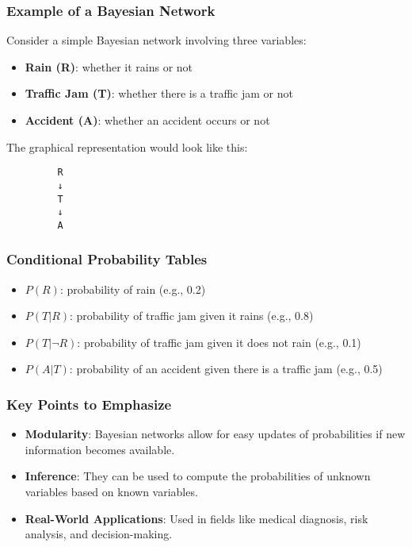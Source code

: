 \documentclass[aspectratio=169]{beamer}
\begin{document}
\begin{frame}[fragile]
    \frametitle{Example of a Bayesian Network}
    Consider a simple Bayesian network involving three variables:
    \begin{itemize}
        \item \textbf{Rain (R)}: whether it rains or not
        \item \textbf{Traffic Jam (T)}: whether there is a traffic jam or not
        \item \textbf{Accident (A)}: whether an accident occurs or not
    \end{itemize}
    
    The graphical representation would look like this:
    \begin{center}
    \begin{verbatim}
         R
         ↓
         T
         ↓
         A
    \end{verbatim}
    \end{center}
\end{frame}

\begin{frame}[fragile]
    \frametitle{Conditional Probability Tables}
    \begin{itemize}
        \item \( P(R) \): probability of rain (e.g., 0.2)
        \item \( P(T | R) \): probability of traffic jam given it rains (e.g., 0.8)
        \item \( P(T | \neg R) \): probability of traffic jam given it does not rain (e.g., 0.1)
        \item \( P(A | T) \): probability of an accident given there is a traffic jam (e.g., 0.5)
    \end{itemize}
\end{frame}

\begin{frame}[fragile]
    \frametitle{Key Points to Emphasize}
    \begin{itemize}
        \item \textbf{Modularity}: Bayesian networks allow for easy updates of probabilities if new information becomes available.
        \item \textbf{Inference}: They can be used to compute the probabilities of unknown variables based on known variables.
        \item \textbf{Real-World Applications}: Used in fields like medical diagnosis, risk analysis, and decision-making.
    \end{itemize}
\end{frame}
\end{document}
